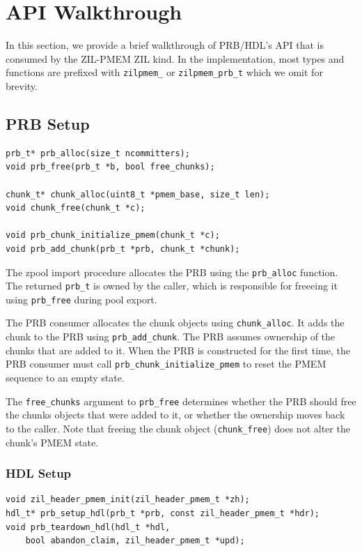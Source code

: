 \documentclass[12pt,a4paper,twoside]{book}
\begin{document}
{\section{API Walkthrough}\label{di:prb:api}
In this section, we provide a brief walkthrough of PRB/HDL's API that is consumed by the ZIL-PMEM ZIL kind.
In the implementation, most types and functions are prefixed with \lstinline{zilpmem_} or \lstinline{zilpmem_prb_t} which we omit for brevity.

\subsection{PRB Setup}
\begin{lstlisting}
prb_t* prb_alloc(size_t ncommitters);
void prb_free(prb_t *b, bool free_chunks);

chunk_t* chunk_alloc(uint8_t *pmem_base, size_t len);
void chunk_free(chunk_t *c);

void prb_chunk_initialize_pmem(chunk_t *c);
void prb_add_chunk(prb_t *prb, chunk_t *chunk);
\end{lstlisting}

The zpool import procedure allocates the PRB using the \lstinline{prb_alloc} function.
The returned \lstinline{prb_t} is owned by the caller, which is responsible for freeeing it using \lstinline{prb_free} during pool export.

The PRB consumer allocates the chunk objects using \lstinline{chunk_alloc}.
It adds the chunk to the PRB using \lstinline{prb_add_chunk}.
The PRB assumes ownership of the chunks that are added to it.
When the PRB is constructed for the first time, the PRB consumer must call \lstinline{prb_chunk_initialize_pmem} to reset the PMEM sequence to an empty state.

The \lstinline{free_chunks} argument to \lstinline{prb_free} determines whether the PRB should free the chunks objects that were added to it, or whether the ownership moves back to the caller.
Note that freeing the chunk object (\lstinline{chunk_free}) does not alter the chunk's PMEM state.

\subsubsection{HDL Setup}\label{di:prb:api:hdl}
\begin{lstlisting}
void zil_header_pmem_init(zil_header_pmem_t *zh);
hdl_t* prb_setup_hdl(prb_t *prb, const zil_header_pmem_t *hdr);
void prb_teardown_hdl(hdl_t *hdl,
    bool abandon_claim, zil_header_pmem_t *upd);
\end{lstlisting}

}
\end{document}
